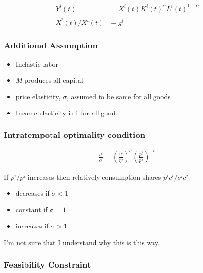 \documentclass[10pt]{article}
\begin{document}
\begin{align}
    Y^i(t) & =X^i(t) K^i(t)^\alpha L^i(t)^{1-\alpha} \\
    \dot{X}^i(t) / X^i(t) & =g^i
\end{align}


\subsubsection{Additional Assumption}

\begin{itemize}
    \item Inelastic labor
    \item $M$ produces all capital
    \item price elasticity, $\sigma$, assumed to be same for all goods
    \item Income elasticity is 1 for all goods
\end{itemize}


\subsubsection{Intratempotal optimality condition}

\begin{align}
    \frac{c^i}{c^j}=\left(\frac{\eta^i}{\eta^j}\right)^\sigma\left(\frac{p^i}{p^j}\right)^{-\sigma} \label{eq:l3_intratemporal_optimality}
\end{align}

If $p^i / p^j$ increases then relatively consumption shares $p^i c^i / p^j c^j$

\begin{itemize}
    \item decreases if $\sigma<1$
    \item constant if $\sigma=1$
    \item increases if $\sigma>1$
\end{itemize}

\color{red}
I'm not sure that I understand why this is this way. 
\color{black}


\subsubsection{Feasibility Constraint}
\end{document}
